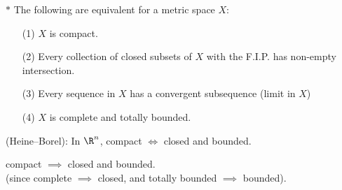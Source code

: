 $\mathbold*$ \thm The following are equivalent for a metric space $X$:
\begin{enumerate}
\item[(1)] $X$ is compact.
\item[(2)] Every collection of closed subsets of $X$ with the F.I.P. has non-empty intersection.
\item[(3)] Every sequence in $X$ has a convergent subsequence (limit in $X$)\footnotemark
\item[(4)] $X$ is complete and totally bounded.
\end{enumerate}%
\cor (Heine--Borel): In $\R^n$, compact $\iff$ closed and bounded.

\cor compact $\implies$ closed and bounded. \\
(since complete $\implies$ closed, and totally bounded $\implies$ bounded).
